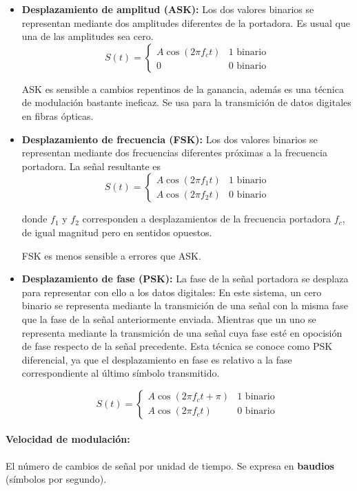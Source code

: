 \begin{itemize}
  \item \textbf{Desplazamiento de amplitud (ASK):} Los dos valores binarios se representan mediante dos amplitudes diferentes de la portadora. Es usual que una de las amplitudes sea cero.
  \[
    S(t) = \begin{cases}
      A\cos(2\pi f_c t) & \text{1 binario} \\
      0 & \text{0 binario}
    \end{cases}
  \]

  ASK es sensible a cambios repentinos de la ganancia, además es una técnica de modulación bastante ineficaz. Se usa para la transmición de datos digitales en fibras ópticas.
  \item  \textbf{Desplazamiento de frecuencia (FSK):} Los dos valores binarios se representan mediante dos frecuencias diferentes próximas a la frecuencia portadora. La señal resultante es
  \[
    S(t) = \begin{cases}
      A\cos(2\pi f_1 t) & \text{1 binario} \\
      A\cos(2\pi f_2 t) & \text{0 binario}
    \end{cases}
  \]
  
  donde \(f_1\) y \(f_2\) corresponden a desplazamientos de la frecuencia portadora \(f_c\), de igual magnitud pero en sentidos opuestos.

  FSK es menos sensible a errores que ASK.
  \item  \textbf{Desplazamiento de fase (PSK):} La fase de la señal portadora se desplaza para representar con ello a los datos digitales: En este sistema, un cero binario se representa mediante la transmición de una señal con la misma fase que la fase de la señal anteriormente enviada. Mientras que un uno se representa mediante la transmición de una señal cuya fase esté en opocisión de fase respecto de la señal precedente. Esta técnica se conoce como PSK diferencial, ya que el desplazamiento en fase es relativo a la fase correspondiente al último símbolo transmitido.
  
  \[
    S(t) = \begin{cases}
      A\cos(2\pi f_c t + \pi) & \text{1 binario} \\
      A\cos(2\pi f_c t) & \text{0 binario}
    \end{cases}
  \]
\end{itemize}

\paragraph{Velocidad de modulación:} El número de cambios de señal por unidad de tiempo. Se expresa en \textbf{baudios} (símbolos por segundo).

